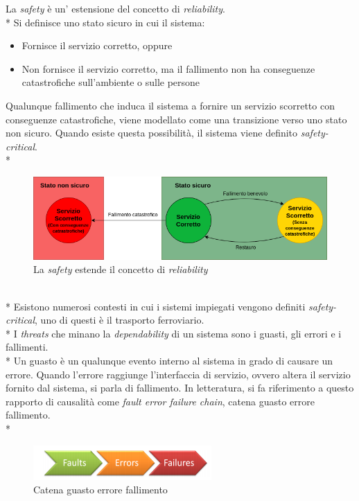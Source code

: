 La \emph{safety} \`e un' estensione del concetto di \emph{reliability}.\\*
Si definisce uno stato sicuro in cui il sistema:
\begin{itemize}
	\item Fornisce il servizio corretto, oppure
	\item Non fornisce il servizio corretto, ma il fallimento non ha conseguenze catastrofiche sull'ambiente o sulle persone
\end{itemize}
Qualunque fallimento che induca il sistema a fornire un servizio scorretto con conseguenze catastrofiche, viene modellato come una transizione verso uno stato non sicuro. Quando esiste questa possibilit\`a, il sistema viene definito \emph{safety-critical}.\cite{safetycritical}\\*
\begin{figure}[h]
	\centering
	\includegraphics[width=0.7\linewidth]{img/safety}
	\caption{La \emph{safety} estende il concetto di \emph{reliability}}
	\label{fig:safety}
\end{figure}\\*
Esistono numerosi contesti in cui i sistemi impiegati vengono definiti \emph{safety-critical}, uno di questi \`e il trasporto ferroviario.\\*
I \emph{threats} che minano la \emph{dependability} di un sistema sono i guasti, gli errori e i fallimenti.\\*
Un guasto \`e un qualunque evento interno al sistema in grado di causare un errore. Quando l'errore raggiunge l'interfaccia di servizio, ovvero altera il servizio fornito dal sistema, si parla di fallimento. In letteratura, si fa riferimento a questo rapporto di causalit\`a come \emph{fault error failure chain}, catena guasto errore fallimento.\\*
\begin{figure}[h]
	\centering
	\includegraphics[width=0.7\linewidth]{img/gefpng}
	\caption{Catena guasto errore fallimento}
	\label{fig:gefpng}
\end{figure}\newpage
